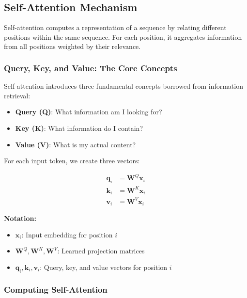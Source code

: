 \documentclass[11pt]{article}
\begin{document}
\subsection{Self-Attention Mechanism}

Self-attention computes a representation of a sequence by relating different positions within the same sequence. For each position, it aggregates information from all positions weighted by their relevance.

\subsubsection{Query, Key, and Value: The Core Concepts}

Self-attention introduces three fundamental concepts borrowed from information retrieval:

\begin{itemize}
    \item \textbf{Query (Q)}: What information am I looking for?
    \item \textbf{Key (K)}: What information do I contain?
    \item \textbf{Value (V)}: What is my actual content?
\end{itemize}

For each input token, we create three vectors:

\begin{equation}
\begin{aligned}
\mathbf{q}_i &= \mathbf{W}^Q \mathbf{x}_i \\
\mathbf{k}_i &= \mathbf{W}^K \mathbf{x}_i \\
\mathbf{v}_i &= \mathbf{W}^V \mathbf{x}_i
\end{aligned}
\end{equation}
\begin{notationbox}
\textbf{Notation:}
\begin{itemize}
    \item $\mathbf{x}_i$: Input embedding for position $i$
    \item $\mathbf{W}^Q, \mathbf{W}^K, \mathbf{W}^V$: Learned projection matrices
    \item $\mathbf{q}_i, \mathbf{k}_i, \mathbf{v}_i$: Query, key, and value vectors for position $i$
\end{itemize}
\end{notationbox}

\subsubsection{Computing Self-Attention}
\end{document}
